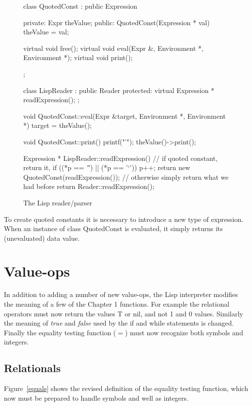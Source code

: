 \begin{figure}
\begin{cprog}
class QuotedConst : public Expression {
private:
	Expr theValue;
public:
	QuotedConst(Expression * val)
		{ theValue = val; }

	virtual void free();
	virtual void eval(Expr &, Environment *, Environment *);
	virtual void print();
};

class LispReader : public Reader {
protected:
	virtual Expression * readExpression();
};

void QuotedConst::eval(Expr &target, Environment *, Environment *)
{
	target = theValue();
}

void QuotedConst::print()
{
	printf("'"); theValue()->print();
}

Expression * LispReader::readExpression()
{
	// if quoted constant, return it,
	if ((*p == '\'') || (*p == '`')) {
		p++;
		return new QuotedConst(readExpression());
		}
	// otherwise simply return what we had before
	return Reader::readExpression();
}
\end{cprog}
\caption{The Lisp reader/parser}\label{lispreader}
\end{figure}

To create quoted constants it is necessary to introduce a new type of
expression.  When an instance of class {\sf QuotedConst} is evaluated,
it simply returns its (unevaluated) data value.

\section{Value-ops}

In addition to adding a number of new value-ops, the Lisp interpreter
modifies the meaning of a few of the Chapter 1 functions.  For example
the relational operators must now return the values {\sf T} or {\sf nil},
and not 1 and 0 values.  Similarly the meaning of {\em true} and {\em false} 
used by the {\sf if} and {\sf while} statements is changed.  Finally the 
equality testing function ($=$) must now recognize both symbols and integers.

\subsection{Relationals}

Figure~\ref{equals} shows the revised definition of the equality testing
function, which now must be prepared to handle symbols and well as
integers.

